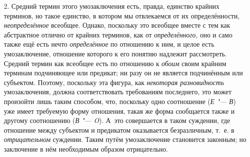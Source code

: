 2. Средний термин этого умозаключения есть, правда, единство
крайних терминов, но такое единство, в котором мы отвлекаемся от их
определённости, {\em неопределённое}
всеобщее. Однако, поскольку это всеобщее вместе с тем как
абстрактное отлично от крайних терминов, как от
{\em определённого,} оно
и само также ещё есть нечто
{\em определённое} по
отношению к ним, и целое есть умозаключение, отношение которого к его
понятию надлежит рассмотреть. Средний термин как всеобщее есть по отношению
к {\em обоим} своим
крайним терминам подчиняющее или предикат; ни разу он не является
подчинённым или субъектом. Поэтому, поскольку эта фигура, как
{\em некоторая разновидность}
умозаключения, должна соответствовать требованиям последнего,
это может произойти лишь таким способом, что, поскольку одно соотношение
({\em Е "--- В})
уже имеет требуемую форму отношения, такая же форма
сообщается также и другому соотношению
({\em В "--- O}). А~это
совершается в таком суждении, где отношение между субъектом и предикатом
оказывается безразличным, т.~е. в
{\em отрицательном}
суждении. Таким путём умозаключение становится законным; но
заключение в нём необходимым образом
отрицательно.


